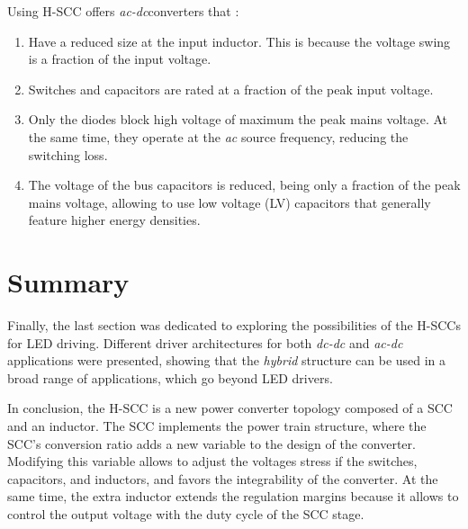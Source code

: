 Using H-SCC offers \emph{ac-dc}converters that :
 \begin{enumerate}

   \item Have a reduced size at the input inductor. This is because the voltage swing is a fraction of the input voltage.

   \item Switches and capacitors are rated at a fraction of the peak input voltage.

   \item Only the diodes block high voltage of  maximum the peak mains voltage. At the same time, they operate at the \emph{ac} source frequency, reducing the switching loss.

   \item The voltage of the bus capacitors is reduced, being only a fraction of the peak mains voltage, allowing to use low voltage (LV) capacitors that generally feature higher energy densities.
 \end{enumerate}

\section{Summary}


Finally, the last section was dedicated to exploring the possibilities of the H-SCCs for LED driving. Different driver architectures for both \emph{dc-dc} and \emph{ac-dc} applications were presented, showing that the \emph{hybrid} structure can be used in a broad range of applications, which go beyond LED drivers.

In conclusion, the H-SCC is a new power converter topology composed of a SCC and an inductor. The SCC implements the power train structure, where the SCC's conversion ratio adds a new variable to the design of the converter. Modifying this variable allows to adjust the voltages stress if the switches, capacitors, and inductors, and favors the integrability of the converter. At the same time, the extra  inductor extends the regulation margins because it allows to control the output voltage with the duty cycle of the SCC stage.

